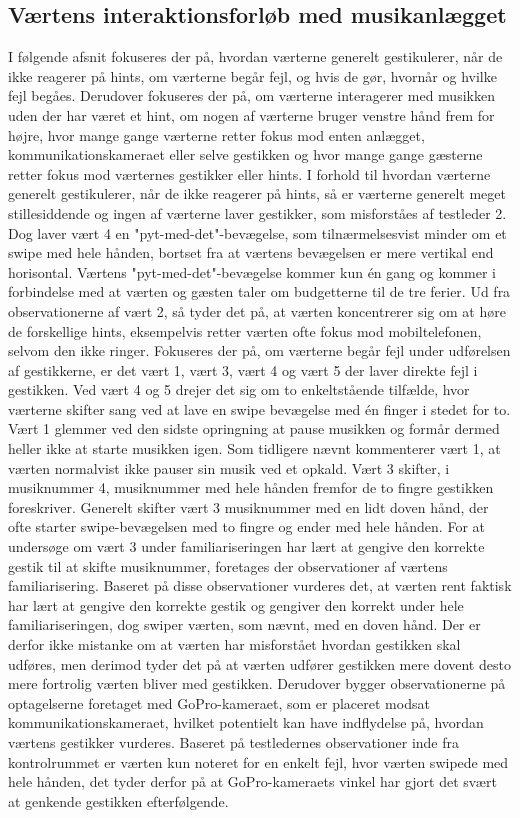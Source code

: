 \subsection{Værtens interaktionsforløb med musikanlægget}
\label{TestresultaterSocialAcceptVaertsGestikker}
%
I følgende afsnit fokuseres der på, hvordan værterne generelt gestikulerer, når de ikke reagerer på hints, om værterne begår fejl, og hvis de gør, hvornår og hvilke fejl begåes. Derudover fokuseres der på, om værterne interagerer med musikken uden der har været et hint, om nogen af værterne bruger venstre hånd frem for højre, hvor mange gange værterne retter fokus mod enten anlægget, kommunikationskameraet eller selve gestikken og hvor mange gange gæsterne retter fokus mod værternes gestikker eller hints.\blankline
%
I forhold til hvordan værterne generelt gestikulerer, når de ikke reagerer på hints, så er værterne generelt meget stillesiddende og ingen af værterne laver gestikker, som misforståes af testleder 2. Dog laver vært 4 en "pyt-med-det"-bevægelse, som tilnærmelsesvist minder om et swipe med hele hånden, bortset fra at værtens bevægelsen er mere vertikal end horisontal. Værtens "pyt-med-det"-bevægelse kommer kun én gang og kommer i forbindelse med at værten og gæsten taler om budgetterne til de tre ferier. Ud fra observationerne af vært 2, så tyder det på, at værten koncentrerer sig om at høre de forskellige hints, eksempelvis retter værten ofte fokus mod mobiltelefonen, selvom den ikke ringer.\blankline
%
Fokuseres der på, om værterne begår fejl under udførelsen af gestikkerne, er det vært 1, vært 3, vært 4 og vært 5 der laver direkte fejl i gestikken. Ved vært 4 og 5 drejer det sig om to enkeltstående tilfælde, hvor værterne skifter sang ved at lave en swipe bevægelse med én finger i stedet for to. Vært 1 glemmer ved den sidste opringning at pause musikken og formår dermed heller ikke at starte musikken igen. Som tidligere nævnt kommenterer vært 1, at værten normalvist ikke pauser sin musik ved et opkald. Vært 3 skifter, i musiknummer 4, musiknummer med hele hånden fremfor de to fingre gestikken foreskriver. Generelt skifter vært 3 musiknummer med en lidt doven hånd, der ofte starter swipe-bevægelsen med to fingre og ender med hele hånden. For at undersøge om vært 3 under familiariseringen har lært at gengive den korrekte gestik til at skifte musiknummer, foretages der observationer af værtens familiarisering. Baseret på disse observationer vurderes det, at værten rent faktisk har lært at gengive den korrekte gestik og gengiver den korrekt under hele familiariseringen, dog swiper værten, som nævnt, med en doven hånd. Der er derfor ikke mistanke om at værten har misforstået hvordan gestikken skal udføres, men derimod tyder det på at værten udfører gestikken mere dovent desto mere fortrolig værten bliver med gestikken. Derudover bygger observationerne på optagelserne foretaget med GoPro-kameraet, som er placeret modsat kommunikationskameraet, hvilket potentielt kan have indflydelse på, hvordan værtens gestikker vurderes. Baseret på testledernes observationer inde fra kontrolrummet er værten kun noteret for en enkelt fejl, hvor værten swipede med hele hånden, det tyder derfor på at GoPro-kameraets vinkel har gjort det svært at genkende gestikken efterfølgende. 

